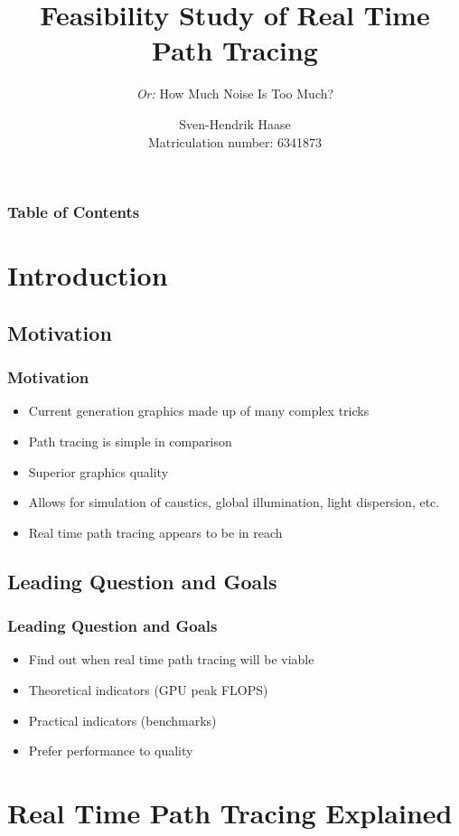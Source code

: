 \documentclass{beamer}
\title[Path Tracing]
{Feasibility Study of Real Time Path Tracing}
\subtitle{\textit{Or:} How Much Noise Is Too Much?}
\author[Haase]{Sven-Hendrik Haase \\ \footnotesize Matriculation number: 6341873}
\institute[University of Hamburg]{
    Department of Computer Science\\
    University of Hamburg
}
\begin{document}
\frame{\titlepage}
\begin{frame}
    \frametitle{Table of Contents}
    \tableofcontents
\end{frame}

\section{Introduction}

\subsection{Motivation}
\begin{frame}
    \frametitle{Motivation}
    \begin{itemize}
        \item Current generation graphics made up of many complex tricks
        \pause
        \item Path tracing is simple in comparison
        \pause
        \item Superior graphics quality
        \pause
        \item Allows for simulation of caustics, global illumination, light dispersion, etc.
        \pause
        \item Real time path tracing appears to be in reach
    \end{itemize}
\end{frame}

\subsection{Leading Question and Goals}
\begin{frame}
    \frametitle{Leading Question and Goals}
    \begin{itemize}
        \item Find out when real time path tracing will be viable
        \item Theoretical indicators (GPU peak FLOPS)
        \item Practical indicators (benchmarks)
        \item Prefer performance to quality
    \end{itemize}
\end{frame}

\section{Real Time Path Tracing Explained}
\end{document}

